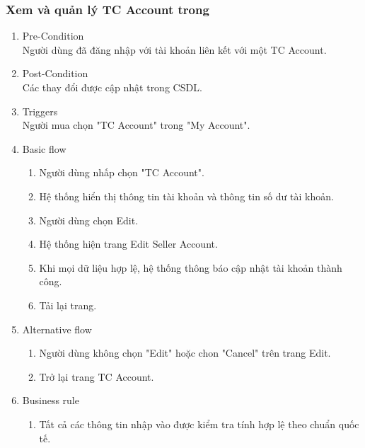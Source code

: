 \subsubsection{Xem và quản lý TC Account trong}
\begin{enumerate}
	\item Pre-Condition\\
	Người dùng đã đăng nhập với tài khoản liên kết với một TC Account.
	\item Post-Condition\\
	Các thay đổi được cập nhật trong CSDL.
	\item Triggers\\
	Người mua chọn "TC Account" trong "My Account".
	\item Basic flow
	\begin{enumerate}
		\item Người dùng nhấp chọn "TC Account".
		\item Hệ thống hiển thị thông tin tài khoản và thông tin số dư tài khoản.
		\item Người dùng chọn Edit.
		\item Hệ thống hiện trang Edit Seller Account.
		\item Khi mọi dữ liệu hợp lệ, hệ thống thông báo cập nhật tài khoản thành công.
		\item Tải lại trang.
	\end{enumerate}
	\item Alternative flow
	\begin{enumerate}
		\item Người dùng không chọn "Edit" hoặc chon "Cancel" trên trang Edit.
		\item Trở lại trang TC Account.
	\end{enumerate}
	\item Business rule
	\begin{enumerate}
		\item Tất cả các thông tin nhập vào được kiểm tra tính hợp lệ theo chuẩn quốc tế.
	\end{enumerate}
\end{enumerate}

